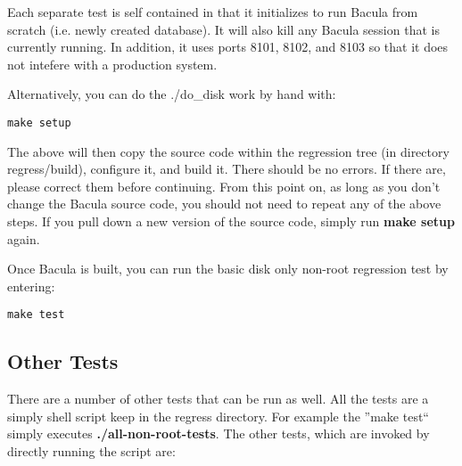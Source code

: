 Each separate test is self contained in that it initializes to run Bacula from
scratch (i.e. newly created database). It will also kill any Bacula session
that is currently running. In addition, it uses ports 8101, 8102, and 8103 so
that it does not intefere with a production system. 

Alternatively, you can do the ./do\_disk work by hand with:

\footnotesize
\begin{verbatim}
make setup
\end{verbatim}
\normalsize

The above will then copy the source code within
the regression tree (in directory regress/build), configure it, and build it.
There should be no errors. If there are, please correct them before
continuing. From this point on, as long as you don't change the Bacula
source code, you should not need to repeat any of the above steps.  If
you pull down a new version of the source code, simply run {\bf make setup}
again.


Once Bacula is built, you can run the basic disk only non-root regression test
by entering: 

\footnotesize
\begin{verbatim}
make test
\end{verbatim}
\normalsize


\subsection{Other Tests}

There are a number of other tests that can be run as well. All the tests are a
simply shell script keep in the regress directory. For example the ''make
test`` simply executes {\bf ./all-non-root-tests}. The other tests, which
are invoked by directly running the script are:

